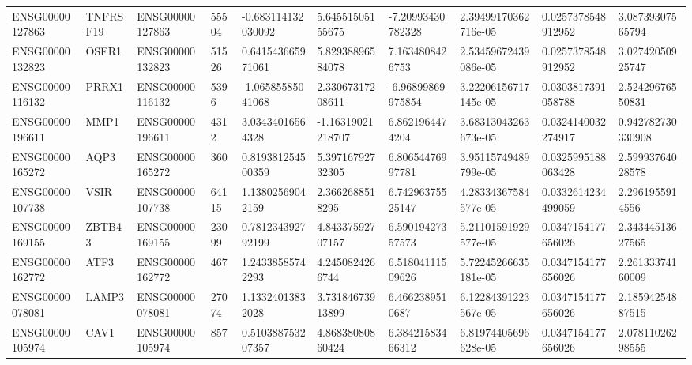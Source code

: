 \begin{tabular}{@{}llllllllll@{}}
ENSG00000127863 & TNFRSF19 & ENSG00000127863 & 55504 & -0.683114132030092 & 5.64551505155675 & -7.20993430782328 & 2.39499170362716e-05 & 0.0257378548912952 & 3.08739307565794 \\
ENSG00000132823 & OSER1 & ENSG00000132823 & 51526 & 0.641543665971061 & 5.82938896584078 & 7.1634808426753 & 2.53459672439086e-05 & 0.0257378548912952 & 3.02742050925747 \\
ENSG00000116132 & PRRX1 & ENSG00000116132 & 5396 & -1.06585585041068 & 2.33067317208611 & -6.96899869975854 & 3.22206156717145e-05 & 0.0303817391058788 & 2.52429676550831 \\
ENSG00000196611 & MMP1 & ENSG00000196611 & 4312 & 3.03434016564328 & -1.16319021218707 & 6.8621964474204 & 3.68313043263673e-05 & 0.0324140032274917 & 0.942782730330908 \\
ENSG00000165272 & AQP3 & ENSG00000165272 & 360 & 0.819381254500359 & 5.39716792732305 & 6.80654476997781 & 3.95115749489799e-05 & 0.0325995188063428 & 2.59993764028578 \\
ENSG00000107738 & VSIR & ENSG00000107738 & 64115 & 1.13802569042159 & 2.3662688518295 & 6.74296375525147 & 4.28334367584577e-05 & 0.0332614234499059 & 2.2961955914556 \\
ENSG00000169155 & ZBTB43 & ENSG00000169155 & 23099 & 0.781234392792199 & 4.84337592707157 & 6.59019427357573 & 5.21101591929577e-05 & 0.0347154177656026 & 2.34344513627565 \\
ENSG00000162772 & ATF3 & ENSG00000162772 & 467 & 1.24338585742293 & 4.2450824266744 & 6.51804111509626 & 5.72245266635181e-05 & 0.0347154177656026 & 2.26133374160009 \\
ENSG00000078081 & LAMP3 & ENSG00000078081 & 27074 & 1.13324013832028 & 3.73184673913899 & 6.4662389510687 & 6.12284391223567e-05 & 0.0347154177656026 & 2.18594254887515 \\
ENSG00000105974 & CAV1 & ENSG00000105974 & 857 & 0.510388753207357 & 4.86838080860424 & 6.38421583466312 & 6.81974405696628e-05 & 0.0347154177656026 & 2.07811026298555 \\
\bottomrule
\end{tabular}
\endgroup
